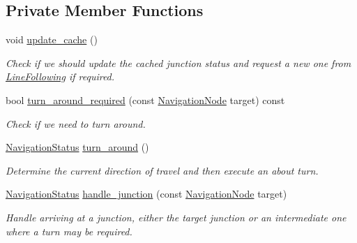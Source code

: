 \subsection*{Private Member Functions}
\begin{DoxyCompactItemize}
\item 
void \hyperlink{classIDP_1_1Navigation_aa7701df4743c75289360a32dfa56d4fc}{update\_\-cache} ()
\begin{DoxyCompactList}\small\item\em Check if we should update the cached junction status and request a new one from \hyperlink{classIDP_1_1LineFollowing}{LineFollowing} if required. \item\end{DoxyCompactList}\item 
bool \hyperlink{classIDP_1_1Navigation_adeb3d2223cc6278ccef5d30e4fbeae82}{turn\_\-around\_\-required} (const \hyperlink{namespaceIDP_a286f26dda01010063dff761803b4cd16}{NavigationNode} target) const 
\begin{DoxyCompactList}\small\item\em Check if we need to turn around. \item\end{DoxyCompactList}\item 
\hyperlink{namespaceIDP_a1a96e566e4d675fdf20780cc96d92283}{NavigationStatus} \hyperlink{classIDP_1_1Navigation_a7da6a103a61fec763688e875920837a4}{turn\_\-around} ()
\begin{DoxyCompactList}\small\item\em Determine the current direction of travel and then execute an about turn. \item\end{DoxyCompactList}\item 
\hyperlink{namespaceIDP_a1a96e566e4d675fdf20780cc96d92283}{NavigationStatus} \hyperlink{classIDP_1_1Navigation_a96241d0be8e7442964c41c6e0e207aa8}{handle\_\-junction} (const \hyperlink{namespaceIDP_a286f26dda01010063dff761803b4cd16}{NavigationNode} target)
\begin{DoxyCompactList}\small\item\em Handle arriving at a junction, either the target junction or an intermediate one where a turn may be required. \item\end{DoxyCompactList}\end{DoxyCompactItemize}
